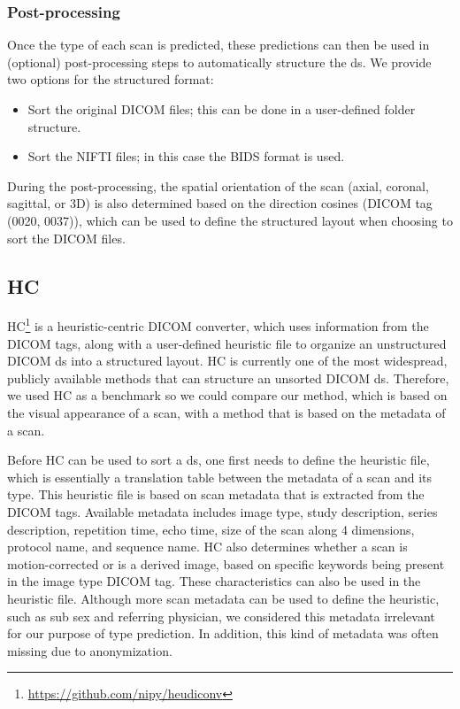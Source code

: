 \subsubsection{Post-processing}

Once the \gls{type} of each \gls{scan} is predicted, these predictions can then be used in (optional) post-processing steps to automatically structure the \gls{ds}.
We provide two options for the structured format:

\begin{itemize}
    \item Sort the original \gls{DICOM} files; this can be done in a user-defined folder structure.
    \item Sort the \gls{NIFTI} files; in this case the \gls{BIDS} format is used.
\end{itemize}

During the post-processing, the spatial orientation of the \gls{scan} (axial, coronal, sagittal, or 3D) is also determined based on the direction cosines (\gls{DICOM} tag (0020, 0037)), which can be used to define the structured layout when choosing to sort the \gls{DICOM} files.

\subsection{\acrlong{HC}}
\gls{HC}\footnote{\url{https://github.com/nipy/heudiconv}} is a heuristic-centric \gls{DICOM} converter, which uses information from the \gls{DICOM} tags, along with a user-defined heuristic file to organize an unstructured \gls{DICOM} \gls{ds} into a structured layout.
\gls{HC} is currently one of the most widespread, publicly available methods that can structure an unsorted \gls{DICOM} \gls{ds}.
Therefore, we used \gls{HC} as a benchmark so we could compare our method, which is based on the visual appearance of a \gls{scan}, with a method that is based on the metadata of a \gls{scan}.

Before \gls{HC} can be used to sort a \gls{ds}, one first needs to define the heuristic file, which is essentially a translation table between the metadata of a \gls{scan} and its \gls{type}.
This heuristic file is based on \gls{scan} metadata that is extracted from the \gls{DICOM} tags.
Available metadata includes image type, study description, series description, repetition time, echo time, size of the \gls{scan} along 4 dimensions, protocol name, and sequence name.
\gls{HC} also determines whether a \gls{scan} is motion-corrected or is a derived image, based on specific keywords being present in the image type \gls{DICOM} tag.
These characteristics can also be used in the heuristic file.
Although more \gls{scan} metadata can be used to define the heuristic, such as \gls{sub} sex and referring physician, we considered this metadata irrelevant for our purpose of \gls{type} prediction.
In addition, this kind of metadata was often missing due to anonymization.



